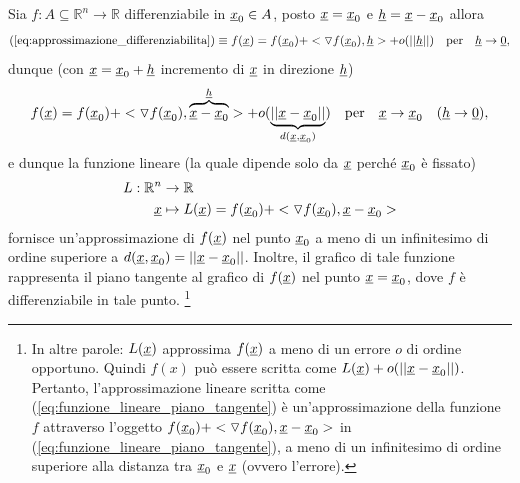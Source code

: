 Sia $f:A\subseteq\mathbb{R}^n\rightarrow\mathbb{R}$ differenziabile in $\uline x_0\in A$, posto $\uline x=\uline x_0$ e $\uline h=\uline x -\uline x_0$ allora
\begin{equation}\label{eq:approssimazione_f}
	(\ref{eq:approssimazione_differenziabilita}) \equiv f(\uline x) = f(\uline x_0) +   <\triangledown f(\uline x_0), \uline h> + o(||\uline h||) \quad \text{per}\quad \uline h\rightarrow \uline 0,
\end{equation}
dunque (con $\uline x=\uline x_0 + \uline h$ incremento di $\uline x$ in direzione $\uline h$)
\begin{equation}\label{eq:approssimazione_f_iperpiano}
	f(\uline x) = f(\uline x_0) + <\triangledown f(\uline x_0), \overbrace{\uline x-\uline x_0}^{\uline h}> + o(\underbrace{||\uline x - \uline x_0||}_{d(\uline x, \uline x_0)}) \quad\text{per}\quad \uline x\rightarrow \uline x_0 \quad (\uline h\rightarrow\uline 0),
\end{equation}
e dunque la funzione lineare (la quale dipende solo da $\uline x$ perché $\uline x_0$ è fissato)
\begin{equation}\label{eq:funzione_lineare_piano_tangente}
	\begin{aligned}
		L:\mathbb{R}^n&\rightarrow\mathbb{R}\\
		\uline x&\mapsto L(\uline x) = f(\uline x_0) + <\triangledown f(\uline x_0), \uline x-\uline x_0>
	\end{aligned}
\end{equation}
fornisce un'approssimazione di $f(\uline x)$ nel punto $\uline x_0$ a meno di un infinitesimo di ordine superiore a $d(\uline x, \uline x_0)=||\uline x - \uline x_0||$. Inoltre, il grafico di tale funzione rappresenta il piano tangente al grafico di $f(\uline x)$ nel punto $\uline x = \uline x_0$, dove $f$ è differenziabile in tale punto. \footnote{In altre parole: $L(\uline x)$ approssima $f(\uline x)$ a meno di un errore $o$ di ordine opportuno. Quindi $f(x)$ può essere scritta come $L(\uline x) + o(||\uline x-\uline x_0||)$. Pertanto, l'approssimazione lineare scritta come (\ref{eq:funzione_lineare_piano_tangente}) è un'approssimazione della funzione $f$ attraverso l'oggetto $f(\uline x_0) + <\triangledown f(\uline x_0), \uline x-\uline x_0>$ in  (\ref{eq:funzione_lineare_piano_tangente}), a meno di un infinitesimo di ordine superiore alla distanza tra $\uline x_0$ e $\uline x$ (ovvero l'errore).}


